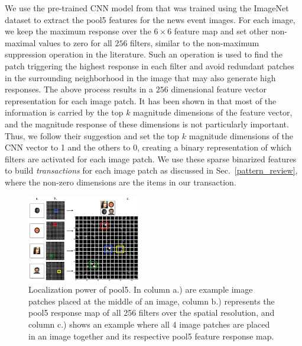\documentclass[10pt,twocolumn,letterpaper]{article}
\begin{document}
{We use the pre-trained CNN model from \cite{Alexnet} that was trained using the ImageNet dataset to extract the pool5 features for the news event images.
For each image, we keep the maximum response over the $6 \times 6$ feature map and set other non-maximal values to zero for all $256$ filters, similar to the non-maximum suppression operation in the literature. Such an operation is used to find the patch triggering the highest response in each filter and avoid redundant patches in the surrounding neighborhood in the image that may also generate high responses. The above process results in a $256$ dimensional feature vector representation for each image patch.
It has been shown in \cite{LiLSH15CVPR} that most of the information is carried by the top $k$ magnitude dimensions of the feature vector, and the magnitude response of these dimensions is not particularly important.
Thus, we follow their suggestion and set the top $k$ magnitude dimensions of the CNN vector to 1 and the others to 0, creating a binary representation of which filters are activated for each image patch.
We use these sparse binarized features to build {\it transactions} for each image patch as discussed in Sec.~\ref{pattern_review}, where the non-zero dimensions are the items in our transaction.

\begin{figure}
  \centering
  \includegraphics[width=0.45\textwidth]{imgs/pool5_img.png}
  \caption{Localization power of pool5.  In column a.) are example image patches placed at the middle of an image, column b.) represents the pool5 response map of all 256 filters over the spatial resolution, and column c.) shows an example where all 4 image patches are placed in an image together and its respective pool5 feature response map.
  }
  \label{fig:pool5}
\end{figure}

}
\end{document}
